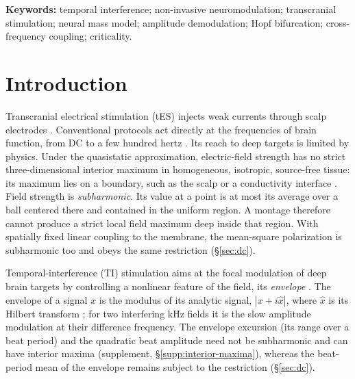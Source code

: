 \documentclass[a4paper]{article}
\newif\ifjne
\begin{document}
\smallskip
\noindent\textbf{Keywords:} temporal interference; non-invasive neuromodulation;
transcranial stimulation; neural mass model; amplitude demodulation; Hopf bifurcation;
cross-frequency coupling; criticality.

\ifjne\else
\clearpage
\tableofcontents
\fi
\clearpage

\section{Introduction}
Transcranial electrical stimulation (tES) injects weak currents through scalp electrodes
\cite{ruffini2013}. Conventional protocols act directly at the frequencies of brain
function, from DC to a few hundred hertz
\cite{reato2010,liu2018,krause2023}. Its reach to deep targets is limited
by physics. Under the quasistatic approximation,
electric-field strength has no strict
three-dimensional interior maximum in homogeneous, isotropic, source-free tissue: its
maximum lies on a boundary, such as the scalp or a conductivity interface
\cite{heller1992}. Field strength is \textit{subharmonic}. Its value at a point
is at most its average over a ball centered there and contained in the uniform
region. A montage therefore cannot produce a strict local field maximum deep
inside that region. With spatially fixed linear
coupling to the membrane, the mean-square polarization is subharmonic too and obeys the
same restriction (\S\ref{sec:dc}). 

Temporal-interference (TI) stimulation aims at the focal modulation of deep brain
targets by controlling a nonlinear feature of the field, its \textit{envelope}
\cite{grossman2017}. The envelope of a signal $x$ is the modulus of its analytic
signal, $|x+i\hat x|$, where $\hat x$ is its Hilbert transform
\cite{gabor1946}; for two interfering kHz fields it is the slow amplitude modulation at
their difference frequency. The envelope excursion (its range over a beat period) and the
quadratic beat amplitude need not be
subharmonic and can have interior maxima (supplement, \S\ref{supp:interior-maxima}),
whereas the beat-period mean of the envelope remains subject to the restriction
(\S\ref{sec:dc}). %
\end{document}
